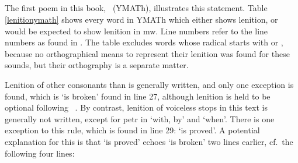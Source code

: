 \subsection{}
The first poem in this book, ~(YMATh), illustrates this statement. Table \ref{lenitionymath} shows every word in YMATh which either shows lenition, or would be expected to show lenition in \gls{mw}. Line numbers refer to the line numbers as found in \textcite{jarman_llyfr_1982}. The table excludes words whose radical starts with  or , because no orthographical means to represent their lenition was found for these sounds, but their orthography is a separate matter. 

Lenition of other consonants than  is generally written, and only one exception is found, which is  `is broken' found in line 27, although lenition is held to be optional following ~\autocite[380]{morgan_y_1952}. By contrast, lenition of voiceless stops in this text is generally not written, except for \gls{petr} in  `with, by' and  `when'. There is one exception to this rule, which is found in line 29:  `is proved'. A potential explanation for this is that  `is proved' echoes  `is broken' two lines earlier, cf.\ the following four lines:

